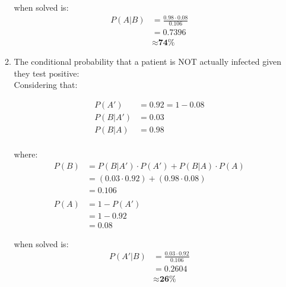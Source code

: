 \documentclass{article}
\begin{document}
\begin{enumerate}
\begin{enumerate}
        when solved is:
        \begin{equation}
        \begin{split}
            P(A|B) &= \frac{0.98 \cdot 0.08}{0.106}\\
            &= 0.7396\\
            & \approx \textbf{74\%}
        \end{split}            
        \end{equation}

\newpage
        \item The conditional probability that a patient is NOT actually infected given they test positive:\\

        Considering that:

        \begin{equation}
        \begin{split}
            P(A') &= 0.92 = 1 - 0.08\\
            P(B|A') &= 0.03\\
            P(B|A) &= 0.98\\
        \end{split}
        \end{equation}

        where:
        \begin{equation}
        \begin{split}
            P(B) &= P(B|A') \cdot P(A') + P(B|A) \cdot P(A)\\
            &= (0.03 \cdot 0.92) + (0.98 \cdot 0.08)\\
            &= 0.106\\~\\
            P(A) &= 1 - P(A')\\
            &= 1 - 0.92\\
            &= 0.08
        \end{split}
        \end{equation}

        when solved is:
        \begin{equation}
        \begin{split}
            P(A'|B) &= \frac{0.03 \cdot 0.92}{0.106}\\
            &= 0.2604\\
            & \approx \textbf{26\%}
        \end{split}            
        \end{equation}


\end{enumerate}
\end{enumerate}
\end{document}
